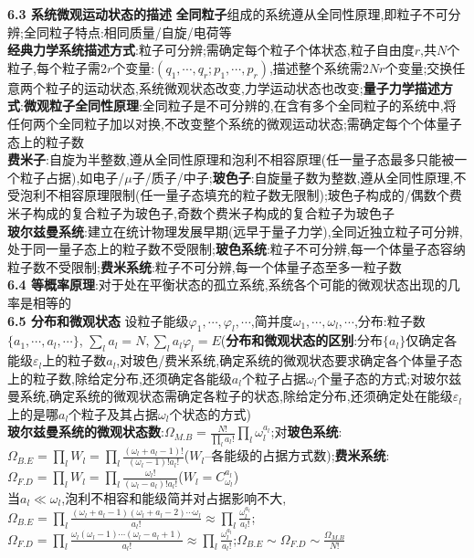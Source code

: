 \documentclass[10pt,a4paper]{article}
\begin{document}
\begin{multicols}{2}
\textbf{6.3 系统微观运动状态的描述}
\textbf{全同粒子}组成的系统遵从全同性原理,即粒子不可分辨;全同粒子特点:相同质量/自旋/电荷等\\
\textbf{经典力学系统描述方式}:粒子可分辨;需确定每个粒子个体状态,粒子自由度$r$,共$N$个粒子,每个粒子需$2r$个变量:$(q_1,\cdots,q_r;p_1,\cdots,p_r)$,描述整个系统需$2Nr$个变量;交换任意两个粒子的运动状态,系统微观状态改变,力学运动状态也改变;\textbf{量子力学描述方式}:\textbf{微观粒子全同性原理}:全同粒子是不可分辨的,在含有多个全同粒子的系统中,将任何两个全同粒子加以对换,不改变整个系统的微观运动状态;需确定每个个体量子态上的粒子数\\
\textbf{费米子}:自旋为半整数,遵从全同性原理和泡利不相容原理(任一量子态最多只能被一个粒子占据),如电子/$\mu$子/质子/中子;\textbf{玻色子}:自旋量子数为整数,遵从全同性原理,不受泡利不相容原理限制(任一量子态填充的粒子数无限制);玻色子构成的/偶数个费米子构成的复合粒子为玻色子,奇数个费米子构成的复合粒子为玻色子\\
\textbf{玻尔兹曼系统}:建立在统计物理发展早期(远早于量子力学),全同近独立粒子可分辨,处于同一量子态上的粒子数不受限制;\textbf{玻色系统}:粒子不可分辨,每一个体量子态容纳粒子数不受限制;\textbf{费米系统}:粒子不可分辨,每一个体量子态至多一粒子数\\
\textbf{6.4 等概率原理}:对于处在平衡状态的孤立系统,系统各个可能的微观状态出现的几率是相等的\\
\textbf{6.5 分布和微观状态}
设粒子能级$\varphi_1,\cdots,\varphi_l,\cdots$,简并度$\omega_1,\cdots,\omega_l,\cdots$,分布:粒子数$\{a_1,\cdots,a_l,\cdots\}$, $\sum_la_l=N,\sum_la_l\varphi_l=E$(\textbf{分布和微观状态的区别}:分布$\{a_l\}$仅确定各能级$\varepsilon_l$上的粒子数$a_l$,对玻色/费米系统,确定系统的微观状态要求确定各个体量子态上的粒子数,除给定分布,还须确定各能级$a_l$个粒子占据$\omega_l$个量子态的方式;对玻尔兹曼系统,确定系统的微观状态需确定各粒子的状态,除给定分布,还须确定处在能级$\varepsilon_l$上的是哪$a_l$个粒子及其占据$\omega_l$个状态的方式)\\
\textbf{玻尔兹曼系统的微观状态数}:$\Omega_{M.B}=\frac{N!}{\prod_la_l!}\prod_l\omega_l^{a_l}$;对\textbf{玻色系统}:$\Omega_{B.E}=\prod_lW_l=\prod_l\frac{(\omega_l+a_l-1)!}{(\omega_l-1)!a_l!}$($W_l$--各能级的占据方式数);\textbf{费米系统}:$\Omega_{F.D}=\prod_lW_l=\prod_l\frac{\omega_l!}{(\omega_l-a_l)!a_l!}$($W_l=C_{\omega_l}^{a_l}$)\\
当$a_l\ll\omega_l$,泡利不相容和能级简并对占据影响不大,$\Omega_{B.E}=\prod_l\frac{(\omega_l+a_l-1)(\omega_l+a_l-2)\cdots\omega_l}{a_l!}\approx\prod_l\frac{\omega_l^{a_l}}{a_l!}$;$\Omega_{F.D}=\prod_l\frac{\omega_l(\omega_l-1)\cdots(\omega_l-a_l+1)}{a_l!}\approx\prod_l\frac{\omega_l^{a_l}}{a_l!}$;$\Omega_{B.E}\sim\Omega_{F.D}\sim\frac{\Omega_{M.B}}{N!}$\\

\end{multicols}
\end{document}
